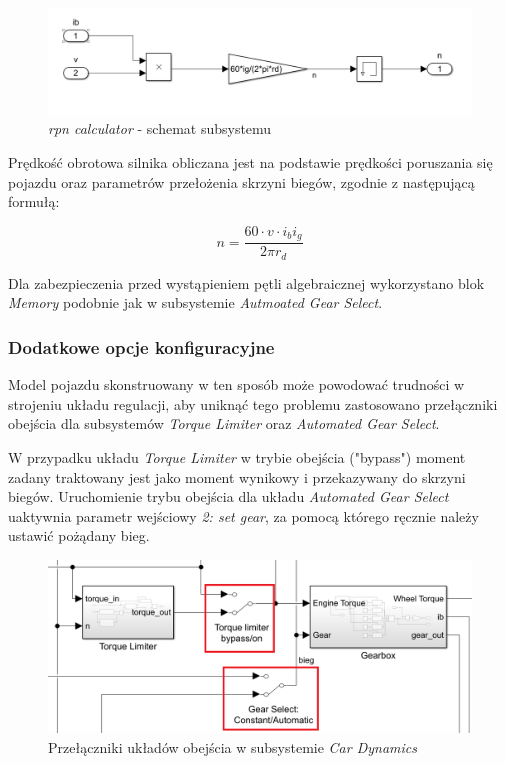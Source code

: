 \documentclass[12pt, a4paper, headings=normal]{article}
\begin{document}
\begin{figure}[H]
	\centering
	\includegraphics[width=\textwidth]{rpmcalc.png}
	\caption{\textit{rpn calculator} - schemat subsystemu}
	\label{fig:rpmcalc}
\end{figure}

Prędkość obrotowa silnika obliczana jest na podstawie prędkości poruszania się pojazdu oraz
parametrów przełożenia skrzyni biegów, zgodnie z następującą formułą:

\begin{equation}
	n = \dfrac{60 \cdot v \cdot i_b i_g}{2 \pi r_d}
	\label{eq:rpmeq}
\end{equation}

Dla zabezpieczenia przed wystąpieniem pętli algebraicznej wykorzystano blok \textit{Memory}
podobnie jak w subsystemie \textit{Autmoated Gear Select}.

\subsubsection{Dodatkowe opcje konfiguracyjne}

Model pojazdu skonstruowany w ten sposób może powodować trudności w strojeniu układu
regulacji, aby uniknąć tego problemu zastosowano przełączniki obejścia dla subsystemów
\textit{Torque Limiter} oraz \textit{Automated Gear Select}. 

W przypadku układu \textit{Torque Limiter} w trybie obejścia ("bypass") moment zadany
traktowany jest jako moment wynikowy i przekazywany do skrzyni biegów. Uruchomienie
trybu obejścia dla układu \textit{Automated Gear Select} uaktywnia parametr wejściowy
\textit{2: set gear}, za pomocą którego ręcznie należy ustawić pożądany bieg.

\begin{figure}[H]
	\centering
	\includegraphics[width=.8\textwidth]{bypass.png}
	\caption{Przełączniki układów obejścia w subsystemie \textit{Car Dynamics}}
	\label{fig:bypass_sw}
\end{figure}
\end{document}
